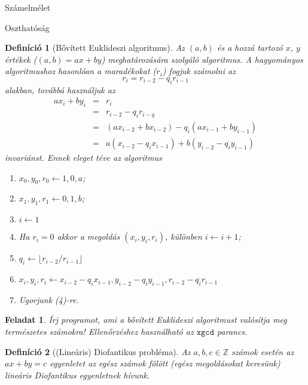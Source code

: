 \documentclass{amsbook}
\theoremstyle{mystyle}
\newtheorem{exercise}{Feladat}[part]
\newtheorem{definition}{Definíció}[section]
\begin{document}
\begin{part}{Számelmélet}
\begin{section}{Oszthatóság}
  \begin{definition}[B\H ovített Euklideszi algoritmus] 
    Az $(a,b)$ és a hozzá tartozó $x$, $y$ értékek ($(a,b)=ax+by$) meghatározására szolgáló
    algoritmus. A hagyományos algoritmushoz hasonlóan a maradékokat ($r_i$)
    fogjuk számolni az \[r_i = r_{i-2} - q_ir_{i-1}\] alakban, továbbá használjuk
    az \[
      \begin{array}{rcl}
        ax_i+by_i & = & r_i \\
                  & = & r_{i-2} - q_ir_{i-q} \\
                  & = & (ax_{i-2} + bx_{i-2}) - q_i(ax_{i-1} + by_{i-1}) \\
                  & = & a(x_{i-2} - q_ix_{i-1}) + b(y_{i-2} - q_iy_{i-1})
      \end{array}
    \] invariánst. Ennek eleget téve az algoritmus
    \begin{enumerate}
      \item $x_0, y_0, r_0 \leftarrow 1, 0, a$;
      \item $x_1, y_1, r_1 \leftarrow 0, 1, b$;
      \item $i \leftarrow 1$
      \item Ha $r_i = 0$ akkor a megoldás $(x_i,y_i,r_i)$, különben $i\leftarrow i+1$;
      \item $q_i \leftarrow \lfloor r_{i-2}/r_{i-1}\rfloor$
      \item $x_i, y_i, r_i \leftarrow x_{i-2}-q_ix_{i-1}, y_{i-2}-q_iy_{i-1},
        r_{i-2}-q_ir_{i-1}$
      \item Ugorjunk (4)-re.
    \end{enumerate}
  \end{definition}

  \begin{exercise} Írj programot, ami a bővített Euklideszi algoritmust
    valósítja meg természetes számokra! Ellen\H orzéshez használható az 
    $\mathtt{xgcd}$ parancs.
  \end{exercise}
  
  \begin{definition}[(Lineáris) Diofantikus probléma]
    Az $a,b,c\in\mathbb{Z}$ számok esetén az $ax+by=c$ egyenletet az egész
    számok fölött (egész megoldásokat keresünk) lineáris Diofantikus 
    egyenletnek hívunk.
  \end{definition}


\end{section}
\end{part}
\end{document}
